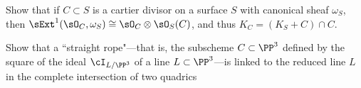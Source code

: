 \begin{exercise}\label{codimension1}
 Show that if $C\subset S$ is a cartier divisor on a surface $S$ with canonical sheaf $\omega_S$, 
 then $\sExt^1(\sO_C, \omega_S) \cong \sO_C\otimes \sO_S(C)$, and thus $K_C = (K_S+C)\cap C$.
\end{exercise}

\begin{exercise}
Show that a ``straight rope"---that is, the subscheme $C \subset \PP^3$ defined by the square of the ideal $\cI_{L/\PP^3}$ of a line $L \subset \PP^3$---is linked to the reduced line $L$ in the complete intersection of two quadrics
\end{exercise}



